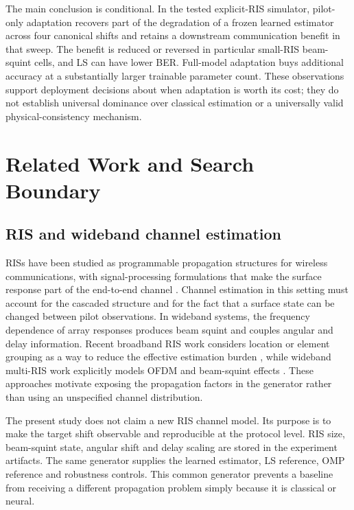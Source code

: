 \documentclass[10pt,twocolumn]{article}
\begin{document}
The main conclusion is conditional. In the tested explicit-RIS simulator, pilot-only adaptation recovers part of the degradation of a frozen learned estimator across four canonical shifts and retains a downstream communication benefit in that sweep. The benefit is reduced or reversed in particular small-RIS beam-squint cells, and LS can have lower BER. Full-model adaptation buys additional accuracy at a substantially larger trainable parameter count. These observations support deployment decisions about when adaptation is worth its cost; they do not establish universal dominance over classical estimation or a universally valid physical-consistency mechanism.

\section{Related Work and Search Boundary}

\subsection{RIS and wideband channel estimation}

RISs have been studied as programmable propagation structures for wireless communications, with signal-processing formulations that make the surface response part of the end-to-end channel \cite{elmossallamy2020ris,bjornson2022ris}. Channel estimation in this setting must account for the cascaded structure and for the fact that a surface state can be changed between pilot observations. In wideband systems, the frequency dependence of array responses produces beam squint and couples angular and delay information. Recent broadband RIS work considers location or element grouping as a way to reduce the effective estimation burden \cite{broadbandRisEstimation2025}, while wideband multi-RIS work explicitly models OFDM and beam-squint effects \cite{widebandMultiRis2025}. These approaches motivate exposing the propagation factors in the generator rather than using an unspecified channel distribution.

The present study does not claim a new RIS channel model. Its purpose is to make the target shift observable and reproducible at the protocol level. RIS size, beam-squint state, angular shift and delay scaling are stored in the experiment artifacts. The same generator supplies the learned estimator, LS reference, OMP reference and robustness controls. This common generator prevents a baseline from receiving a different propagation problem simply because it is classical or neural.
\end{document}
